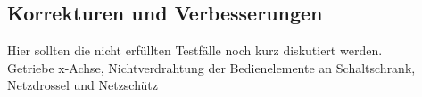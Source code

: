 \documentclass[../../../Bachelorarbeit.tex]{subfiles}
\begin{document}
\subsection{Korrekturen und Verbesserungen}
\color{red}
Hier sollten die nicht erfüllten Testfälle noch kurz diskutiert werden.\\
Getriebe x-Achse, Nichtverdrahtung der Bedienelemente an Schaltschrank, Netzdrossel und Netzschütz
\end{document}
